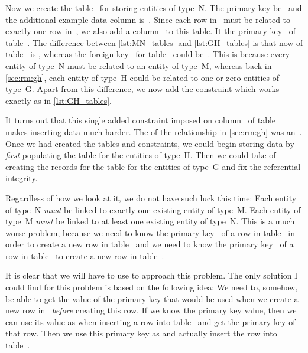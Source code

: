 Now we create the table~ for storing entities of type~N.
The primary key be~ and the additional example data column is~.
Since each row in~ must be related to exactly one row in~, we also add a column~ to this table.
It  the primary key~ of table~.
The difference between \cref{lst:MN_tables} and \cref{lst:GH_tables} is that now  of table~ is , whereas the foreign key~ for table~ could be~.
This is because every entity of type~N must be related to an entity of type~M, whereas back in \cref{sec:rm:gh}, each entity of type~H could be related to one or zero entities of type~G.
Apart from this difference, we now add the constraint  which works exactly as  in \cref{lst:GH_tables}.

It turns out that this single added  constraint imposed on column~ of table~ makes inserting data much harder.
The  of the relationship in \cref{sec:rm:gh} was an~.
Once we had created the tables and constraints, we could begin storing data by \emph{first} populating the table for the entities of type~H.
Then we could take of creating the records for the table for the entities of type~G and fix the referential integrity.

Regardless of how we look at it, we do not have such luck this time:
Each entity of type~N \emph{must} be linked to exactly one existing entity of type~M.
Each entity of type~M \emph{must} be linked to at least one existing entity of type~N.
This is a much worse problem, because we need to know the primary key~ of a row in table~ in order to create a new row in table~ and we need to know the primary key~ of a row in table~ to create a new row in table~.

It is clear that we will have to use  to approach this problem.
The only solution I could find for this problem is based on the following idea:
We need to, somehow, be able to get the value of the primary key that would be used when we create a new row in~ \emph{before} creating this row.
If we know the primary key value, then we can use its value as  when inserting a row into table~ and get the primary key of that row.
Then we use this primary key as  and actually insert the row into table~.

